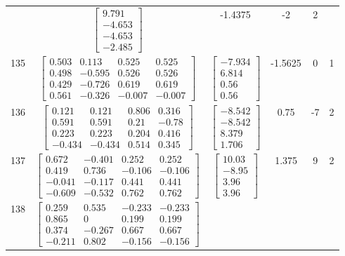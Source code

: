 \documentclass[a4paper,12pt]{article}
\begin{document}
\begin{tabular}{c c c c c c}
&
$\begin{bmatrix} 9.791 \\ -4.653 \\ -4.653 \\ -2.485 \end{bmatrix}$
&
-1.4375
&
-2
&
2
\\
135
&
$\begin{bmatrix} 0.503 & 0.113 & 0.525 & 0.525 \\ 0.498 & -0.595 & 0.526 & 0.526 \\ 0.429 & -0.726 & 0.619 & 0.619 \\ 0.561 & -0.326 & -0.007 & -0.007 \end{bmatrix}$
&
$\begin{bmatrix} -7.934 \\ 6.814 \\ 0.56 \\ 0.56 \end{bmatrix}$
&
-1.5625
&
0
&
1
\\
136
&
$\begin{bmatrix} 0.121 & 0.121 & 0.806 & 0.316 \\ 0.591 & 0.591 & 0.21 & -0.78 \\ 0.223 & 0.223 & 0.204 & 0.416 \\ -0.434 & -0.434 & 0.514 & 0.345 \end{bmatrix}$
&
$\begin{bmatrix} -8.542 \\ -8.542 \\ 8.379 \\ 1.706 \end{bmatrix}$
&
0.75
&
-7
&
2
\\
137
&
$\begin{bmatrix} 0.672 & -0.401 & 0.252 & 0.252 \\ 0.419 & 0.736 & -0.106 & -0.106 \\ -0.041 & -0.117 & 0.441 & 0.441 \\ -0.609 & -0.532 & 0.762 & 0.762 \end{bmatrix}$
&
$\begin{bmatrix} 10.03 \\ -8.95 \\ 3.96 \\ 3.96 \end{bmatrix}$
&
1.375
&
9
&
2
\\
138
&
$\begin{bmatrix} 0.259 & 0.535 & -0.233 & -0.233 \\ 0.865 & 0 & 0.199 & 0.199 \\ 0.374 & -0.267 & 0.667 & 0.667 \\ -0.211 & 0.802 & -0.156 & -0.156 \end{bmatrix}$

\end{tabular}
\end{document}
